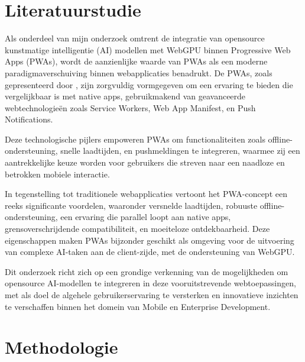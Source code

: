 \documentclass{hogent-article}
\begin{document}
\section{Literatuurstudie}%
\label{sec:literatuurstudie}

Als onderdeel van mijn onderzoek omtrent de integratie van opensource kunstmatige intelligentie (AI) 
modellen met WebGPU binnen Progressive Web Apps (PWAs), 
wordt de aanzienlijke waarde van PWAs als een moderne paradigmaverschuiving binnen webapplicaties benadrukt. 
De PWAs, zoals gepresenteerd door \textcite{Shumylo2023}, 
zijn zorgvuldig vormgegeven om een ervaring te bieden die vergelijkbaar is met native apps, 
gebruikmakend van geavanceerde webtechnologieën zoals Service Workers, Web App Manifest, en Push Notifications.

Deze technologische pijlers empoweren PWAs om functionaliteiten zoals offline-ondersteuning, 
snelle laadtijden, en pushmeldingen te integreren, 
waarmee zij een aantrekkelijke keuze worden voor gebruikers die streven naar een naadloze en betrokken mobiele interactie.

In tegenstelling tot traditionele webapplicaties vertoont het PWA-concept een reeks significante voordelen, 
waaronder versnelde laadtijden, 
robuuste offline-ondersteuning, een ervaring die parallel loopt aan native apps, 
grensoverschrijdende compatibiliteit, en moeiteloze ontdekbaarheid. 
Deze eigenschappen maken PWAs bijzonder geschikt als omgeving voor de uitvoering van complexe AI-taken aan de client-zijde, 
met de ondersteuning van WebGPU.

Dit onderzoek richt zich op een grondige verkenning van de mogelijkheden om opensource AI-modellen te integreren in deze vooruitstrevende webtoepassingen, 
met als doel de algehele gebruikerservaring te versterken en innovatieve inzichten te verschaffen binnen het domein van Mobile en Enterprise Development.




\section{Methodologie}%
\label{sec:methodologie}

\end{document}

